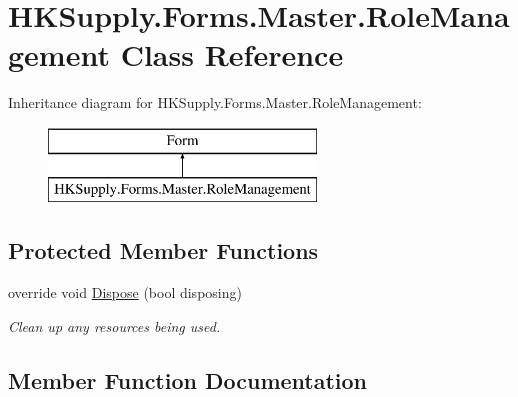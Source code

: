 \hypertarget{class_h_k_supply_1_1_forms_1_1_master_1_1_role_management}{}\section{H\+K\+Supply.\+Forms.\+Master.\+Role\+Management Class Reference}
\label{class_h_k_supply_1_1_forms_1_1_master_1_1_role_management}
Inheritance diagram for H\+K\+Supply.\+Forms.\+Master.\+Role\+Management\+:\begin{figure}[H]
\begin{center}
\leavevmode
\includegraphics[height=2.000000cm]{class_h_k_supply_1_1_forms_1_1_master_1_1_role_management}
\end{center}
\end{figure}
\subsection*{Protected Member Functions}
\begin{DoxyCompactItemize}
\item 
override void \hyperlink{class_h_k_supply_1_1_forms_1_1_master_1_1_role_management_aec6f44de37a82c49e6166b2d83e65885}{Dispose} (bool disposing)
\begin{DoxyCompactList}\small\item\em Clean up any resources being used. \end{DoxyCompactList}\end{DoxyCompactItemize}


\subsection{Member Function Documentation}
\mbox{\label{class_h_k_supply_1_1_forms_1_1_master_1_1_role_management_aec6f44de37a82c49e6166b2d83e65885}} 

